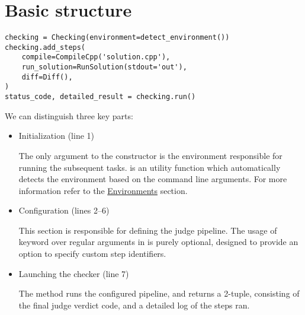 \section{Basic structure}\label{sec:example}

\begin{verbatim}
checking = Checking(environment=detect_environment())
checking.add_steps(
    compile=CompileCpp('solution.cpp'),
    run_solution=RunSolution(stdout='out'),
    diff=Diff(),
)
status_code, detailed_result = checking.run()
\end{verbatim}

We can distinguish three key parts:
\begin{itemize}
    \item Initialization (line 1)

    The only argument to the  constructor is the environment responsible for running
    the subsequent tasks.
    \hyperref[sec:detect_environment]{} is an utility function which automatically detects
    the environment based on the command line arguments.
    For more information refer to the \hyperref[sec:environments]{Environments} section.
    \item Configuration (lines 2--6)

    This section is responsible for defining the judge pipeline.
    The usage of keyword over regular arguments in  is purely optional, designed to provide an
    option to specify custom step identifiers.
    \item Launching the checker (line 7)

    The  method runs the configured pipeline, and returns a 2-tuple, consisting of the final
    judge verdict code, and a detailed log of the steps ran.
\end{itemize}
